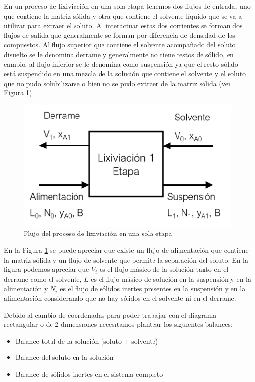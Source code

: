 \documentclass[11pt]{book}
\begin{document}
En un proceso de lixiviación en una sola etapa tenemos dos flujos de entrada, uno que contiene la matriz sólida y otra que contiene el solvente líquido que se va a utilizar para extraer el soluto. Al interactuar estas dos corrientes se forman dos flujos de salida que generalmente se forman por diferencia de densidad de los compuestos. Al flujo superior que contiene el solvente acompañado del soluto disuelto se le denomina derrame y generalmente no tiene restos de sólido, en cambio, al flujo inferior se le denomina como suspensión ya que el resto sólido está suspendido en una mezcla de la solución que contiene el solvente y el soluto que no pudo solubilizarse o bien no se pudo extraer de la matriz sólida (ver Figura \ref{fig:Lixiviacion_3_b})

\begin{figure}[H]
    \centering
    \includegraphics[width = 8 cm]{img/lixiviacion/EquilibrioLixiviacion_3.PNG}
    \caption{Flujo del proceso de lixiviación en una sola etapa}
    \label{fig:Lixiviacion_3_b}
\end{figure}

En la Figura \ref{fig:Lixiviacion_3_b} se puede apreciar que existe un flujo de alimentación que contiene la matriz sólida y un flujo de solvente que permite la separación del soluto. En la figura podemos apreciar que $V_i$ es el flujo másico de la solución tanto en el derrame como el solvente, $L$ es el flujo másico de solución en la suspensión y en la alimentación y $N_i$ es el flujo de sólidos inertes presentes en la suspensión y en la alimentación considerando que no hay sólidos en el solvente ni en el derrame.

Debido al cambio de coordenadas para poder trabajar con el diagrama rectangular o de 2 dimensiones necesitamos plantear los siguientes balances:

\begin{itemize}
    \item Balance total de la solución (soluto + solvente)
    
    \item Balance del soluto en la solución
    
    \item Balance de sólidos inertes en el sistema completo
\end{itemize}
\end{document}
